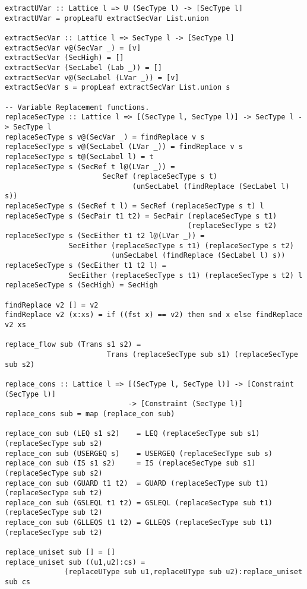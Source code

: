 \begin{Verbatim}[fontsize=\footnotesize,frame=lines,
                 framesep=5mm, label={[FlowArrowRef.hs]FlowArrowRef.hs}]
extractUVar :: Lattice l => U (SecType l) -> [SecType l]
extractUVar = propLeafU extractSecVar List.union

extractSecVar :: Lattice l => SecType l -> [SecType l]
extractSecVar v@(SecVar _) = [v]
extractSecVar (SecHigh) = []
extractSecVar (SecLabel (Lab _)) = []
extractSecVar v@(SecLabel (LVar _)) = [v]
extractSecVar s = propLeaf extractSecVar List.union s

-- Variable Replacement functions.
replaceSecType :: Lattice l => [(SecType l, SecType l)] -> SecType l -> SecType l
replaceSecType s v@(SecVar _) = findReplace v s 
replaceSecType s v@(SecLabel (LVar _)) = findReplace v s
replaceSecType s t@(SecLabel l) = t
replaceSecType s (SecRef t l@(LVar _)) = 
                       SecRef (replaceSecType s t) 
                              (unSecLabel (findReplace (SecLabel l) s))
replaceSecType s (SecRef t l) = SecRef (replaceSecType s t) l
replaceSecType s (SecPair t1 t2) = SecPair (replaceSecType s t1) 
                                           (replaceSecType s t2)
replaceSecType s (SecEither t1 t2 l@(LVar _)) = 
               SecEither (replaceSecType s t1) (replaceSecType s t2) 
                         (unSecLabel (findReplace (SecLabel l) s))
replaceSecType s (SecEither t1 t2 l) = 
               SecEither (replaceSecType s t1) (replaceSecType s t2) l
replaceSecType s (SecHigh) = SecHigh

findReplace v2 [] = v2
findReplace v2 (x:xs) = if ((fst x) == v2) then snd x else findReplace v2 xs

replace_flow sub (Trans s1 s2) =  
                        Trans (replaceSecType sub s1) (replaceSecType sub s2) 

replace_cons :: Lattice l => [(SecType l, SecType l)] -> [Constraint (SecType l)] 
                             -> [Constraint (SecType l)]
replace_cons sub = map (replace_con sub)

replace_con sub (LEQ s1 s2)    = LEQ (replaceSecType sub s1) (replaceSecType sub s2)
replace_con sub (USERGEQ s)    = USERGEQ (replaceSecType sub s)
replace_con sub (IS s1 s2)     = IS (replaceSecType sub s1) (replaceSecType sub s2)
replace_con sub (GUARD t1 t2)  = GUARD (replaceSecType sub t1) (replaceSecType sub t2)
replace_con sub (GSLEQL t1 t2) = GSLEQL (replaceSecType sub t1) (replaceSecType sub t2)
replace_con sub (GLLEQS t1 t2) = GLLEQS (replaceSecType sub t1) (replaceSecType sub t2)

replace_uniset sub [] = []
replace_uniset sub ((u1,u2):cs) = 
              (replaceUType sub u1,replaceUType sub u2):replace_uniset sub cs


\end{Verbatim}
